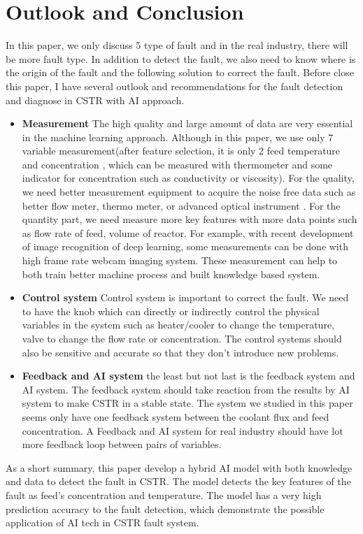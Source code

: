 \documentclass[fleqn,11pt]{wlscirep}
\begin{document}
\section{Outlook and Conclusion}
 In this paper, we only discuss 5 type of fault and in the real industry, there will be more fault type. In  addition to detect the fault, we also need to know where is the origin of the fault and the following solution to correct the fault. Before close this paper, I have several outlook and recommendations for the fault detection and diagnose in CSTR with AI approach.
\begin{itemize}
    \item \textbf{Measurement} The high quality  and large amount of data are very essential in the machine learning approach. Although in this paper, we use only 7 variable measurement(after feature selection, it is only 2 feed temperature and concentration , which can be measured with thermometer and some indicator for concentration such as conductivity or  viscosity). For the quality, we need better measurement equipment to acquire the noise free data such as better flow meter, thermo meter, or advanced optical instrument . For the quantity part, we need measure more key features with more data points such as flow rate of feed, volume of reactor. For example, with recent development of image recognition of deep learning, some measurements can be done with high frame rate webcam imaging system. These measurement can help to both train better machine process and built knowledge based system. 
     \item \textbf{Control system} Control system is important to correct the fault. We need to have the knob which can directly or indirectly control the physical variables in the system such as heater/cooler to change the temperature, valve to change the flow rate or concentration. The control systems should also be sensitive and accurate so that they don't introduce new problems.
     \item \textbf{Feedback and AI system} the least but not last is the feedback system and AI system. The feedback system should take reaction from the results by AI system to make CSTR in a stable state. The system we studied in this paper seems only have one feedback system between the coolant flux and feed concentration. A Feedback and AI system for real industry should have lot more feedback loop between pairs of variables.  
\end{itemize}
As a short summary, this paper develop a hybrid AI model with both knowledge and data to detect the fault in CSTR. The model detects the key features of the fault as feed's concentration and temperature. The model has a very high prediction accuracy to the fault detection, which demonstrate the possible application of AI tech in CSTR fault system.


\end{document}
